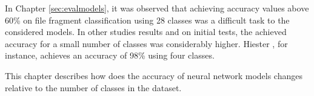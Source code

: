 In Chapter \ref{sec:evalmodels}, it was observed that achieving accuracy values above 60\% on file fragment classification using 28 classes was a difficult task to the considered models. In other studies results \cite{hiester_file_2018} \cite{sportiello_context-based_2012} \cite{amirani_feature-based_2013} \cite{maslim_distributed_2014} and on initial tests, the achieved accuracy for a small number of classes was considerably higher. Hiester \cite{hiester_file_2018}, for instance, achieves an accuracy of 98\% using four classes.

This chapter describes how does the accuracy of neural network models changes relative to the number of classes in the dataset.

